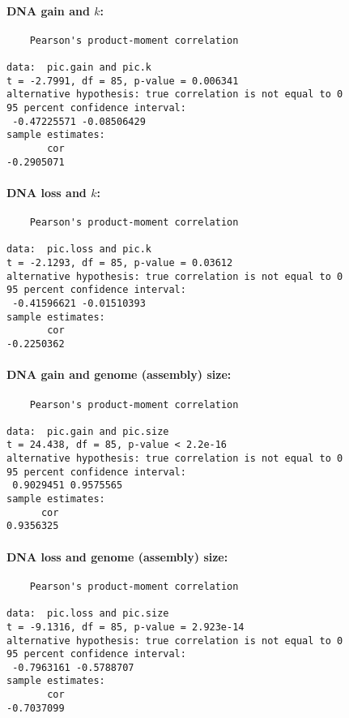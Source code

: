 \paragraph{DNA gain and $k$:}

\begin{verbatim}
	Pearson's product-moment correlation

data:  pic.gain and pic.k
t = -2.7991, df = 85, p-value = 0.006341
alternative hypothesis: true correlation is not equal to 0
95 percent confidence interval:
 -0.47225571 -0.08506429
sample estimates:
       cor 
-0.2905071 
\end{verbatim}

\paragraph{DNA loss and $k$:}

\begin{verbatim}
	Pearson's product-moment correlation

data:  pic.loss and pic.k
t = -2.1293, df = 85, p-value = 0.03612
alternative hypothesis: true correlation is not equal to 0
95 percent confidence interval:
 -0.41596621 -0.01510393
sample estimates:
       cor 
-0.2250362 
\end{verbatim}

\paragraph{DNA gain and genome (assembly) size:}

\begin{verbatim}
	Pearson's product-moment correlation

data:  pic.gain and pic.size
t = 24.438, df = 85, p-value < 2.2e-16
alternative hypothesis: true correlation is not equal to 0
95 percent confidence interval:
 0.9029451 0.9575565
sample estimates:
      cor 
0.9356325 
\end{verbatim}

\paragraph{DNA loss and genome (assembly) size:}

\begin{verbatim}
	Pearson's product-moment correlation

data:  pic.loss and pic.size
t = -9.1316, df = 85, p-value = 2.923e-14
alternative hypothesis: true correlation is not equal to 0
95 percent confidence interval:
 -0.7963161 -0.5788707
sample estimates:
       cor 
-0.7037099 
\end{verbatim}

